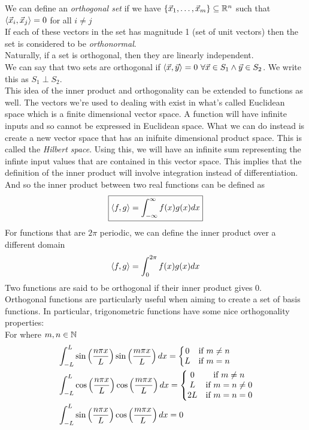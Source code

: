 \documentclass[11pt, fleqn]{article}
\begin{document}
We can define an \textit{orthogonal set} if we have $\left\{ \vec{x}_1,\ldots,\vec{x}_m \right\}\subseteq\mathbb{R}^n$ such that $\left\langle \vec{x}_i,\vec{x}_j \right\rangle=0$ for all $i\neq j$\\
If each of these vectors in the set has magnitude 1 (set of unit vectors) then the set is considered to be \textit{orthonormal}.\\
Naturally, if a set is orthogonal, then they are linearly independent.\\
We can say that two sets are orthogonal if $\left\langle \vec{x},\vec{y} \right\rangle=0\ \forall\vec{x}\in S_1\wedge\vec{y}\in S_2$. We write this as $S_1\perp S_2$.\\

This idea of the inner product and orthogonality can be extended to functions as well. The vectors we're used to dealing with exist in what's called Euclidean space which is a finite dimensional vector space.
A function will have infinite inputs and so cannot be expressed in Euclidean space. What we can do instead is create a new vector space that has an inifnite dimensional product space. This is called the \textit{Hilbert space}.
Using this, we will have an infinite sum representing the infinte input values that are contained in this vector space. This implies that the definition of the inner product will involve integration instead of differentiation.
And so the inner product between two real functions can be defined as
$$\boxed{\left\langle f,g \right\rangle=\int_{-\infty}^\infty f(x)g(x)dx}$$
For functions that are $2\pi$ periodic, we can define the inner product over a different domain
$$\left\langle f,g \right\rangle=\int_0^{2\pi}f(x)g(x)dx$$
Two functions are said to be orthogonal if their inner product gives 0.\\
Orthogonal functions are particularly useful when aiming to create a set of basis functions. In particular, trigonometric functions have some nice orthogonality properties:\\
For where $m,n\in\mathbb{N}$
\begin{align*}
    &\int_{-L}^L\sin\left( \frac{n\pi x}{L} \right)\sin\left( \frac{m\pi x}{L} \right)dx=\left\{\begin{matrix} 0 & \text{if }m\neq n\\ L & \text{if }m=n \end{matrix}\right.\\
    &\int_{-L}^L\cos\left( \frac{n\pi x}{L} \right)\cos\left( \frac{m\pi x}{L} \right)dx=\left\{\begin{matrix} 0 & \text{if }m\neq n\\ L & \text{if }m=n\neq 0\\ 2L & \text{if }m=n=0 \end{matrix}\right.\\
    &\int_{-L}^L\sin\left( \frac{n\pi x}{L} \right)\cos\left( \frac{m\pi x}{L} \right)dx=0
\end{align*}
\end{document}
